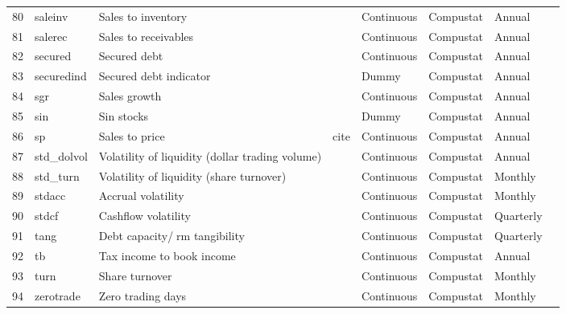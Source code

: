 \documentclass[a4paper, table]{article}
\begin{document}
\begin{landscape}
\begin{table}
\begin{center}
\begin{longtable}{llllllll}
			80 & saleinv & Sales to inventory & 
				\cite{ou_financial_1989} & Continuous & Compustat & Annual \\
			81 & salerec & Sales to receivables & 
				\cite{ou_financial_1989} & Continuous & Compustat & Annual \\
			82 & secured & Secured debt & 
				\cite{valta_strategic_2016} & Continuous & Compustat & Annual \\
			83 & securedind & Secured debt indicator & \cite{valta_strategic_2016} & Dummy & Compustat & Annual \\
			84 & sgr & Sales growth & 
				\cite{barbee_jr_salesprice_1996} & Continuous & Compustat & Annual \\
			85 & sin & Sin stocks & 
				\cite{hong_price_2009} & Dummy & Compustat & Annual \\
			86 & sp & Sales to price & 
				cite & Continuous & Compustat & Annual \\
			87 & std\_dolvol & Volatility of liquidity (dollar trading volume) & 
				\cite{chordia_trading_2001} & Continuous & Compustat & Annual \\
			88 & std\_turn & Volatility of liquidity (share turnover) & 
				\cite{chordia_trading_2001} & Continuous & Compustat & Monthly \\
			89 & stdacc & Accrual volatility & 
				\cite{bandyopadhyay_accrual_2010} & Continuous & Compustat & Monthly \\ \hline
			90 & stdcf & Cashflow volatility & 
				\cite{huang_cross_2009} & Continuous & Compustat & Quarterly \\
			91 & tang & Debt capacity/rm tangibility & 
				\cite{almeida_financial_2007} & Continuous & Compustat & Quarterly \\
			92 & tb & Tax income to book income & 
				\cite{lev_market-based_1982} & Continuous & Compustat & Annual \\
			93 & turn & Share turnover & 
				\cite{datar_liquidity_1998} & Continuous & Compustat & Monthly \\
			94 & zerotrade & Zero trading days & 
				\cite{liu_liquidity-augmented_2006} & Continuous & Compustat & Monthly \\	
		\end{longtable}
	\end{center}
\end{table}
\end{landscape}
\end{document}
